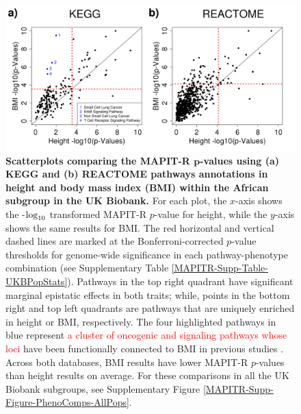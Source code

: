 \documentclass[10pt]{article}
\def\log{{\rm log}}
\begin{document}
\begin{figure}[htb]
\centering
\includegraphics[width=\textwidth]{Images/Main/Figure3.png}
\caption{\textbf{Scatterplots comparing the MAPIT-R $\bm{p}$-values using (a) KEGG and (b) REACTOME pathways annotations in height and body mass index (BMI) within the African subgroup in the UK Biobank.} For each plot, the $x$-axis shows the -$\log_{10}$ transformed MAPIT-R $p$-value for height, while the $y$-axis shows the same results for BMI. The red horizontal and vertical dashed lines are marked at the Bonferroni-corrected $p$-value thresholds for genome-wide significance in each pathway-phenotype combination (see Supplementary Table \ref{MAPITR-Supp-Table-UKBPopStats}). Pathways in the top right quadrant have significant marginal epistatic effects in both traits; while, points in the bottom right and top left quadrants are pathways that are uniquely enriched in height or BMI, respectively. The four highlighted pathways in blue represent \textcolor{red}{a cluster of oncogenic and signaling pathways whose loci} have been functionally connected to BMI in previous studies \cite{George2004,Ortega-Molina2015,Manning2017,Justice2017,Latva-Rasku2018,Grigsby2018,Huang2018,Couto2019}. Across both databases, BMI results have lower MAPIT-R $p$-values than height results on average. For these comparisons in all the UK Biobank subgroups, see Supplementary Figure \ref{MAPITR-Supp-Figure-PhenoComps-AllPops}.}
\label{MAPITR-Main-Figure-PhenoComps-African}
\end{figure}

\end{document}
